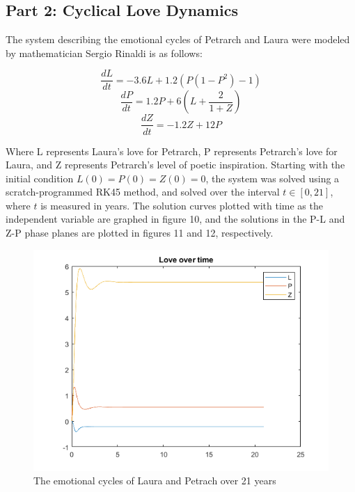 \documentclass[11pt]{article}
\begin{document}
\subsection{Part 2: Cyclical Love Dynamics}
%
The system describing the emotional cycles of Petrarch and Laura were modeled by
mathematician Sergio Rinaldi is as follows:

$$\frac{dL}{dt}=-3.6L+1.2(P(1-P^{2})-1)$$
$$\frac{dP}{dt}=1.2P+6(L+\frac{2}{1+Z})$$
$$\frac{dZ}{dt}=-1.2Z+12P$$

Where L represents Laura's love for Petrarch, P represents Petrarch's love for
Laura, and Z represents Petrarch's level of poetic inspiration. Starting with the 
initial condition $L(0)=P(0)=Z(0)=0$, the system was solved using a scratch-programmed
RK45 method, and solved
over the interval
$t\in [0,21]$, where $t$ is measured in years. The solution curves plotted with time 
as the independent variable are graphed in figure 10, and the solutions in the
P-L and Z-P phase planes are plotted in figures 11 and 12, respectively. 

\begin{figure} [!h]
\centering
        \includegraphics[totalheight=8cm]{love1.png}
    \caption{The emotional cycles of Laura and Petrach over 21 years}
    \label{figure10}
\end{figure}

\newpage
\end{document}
